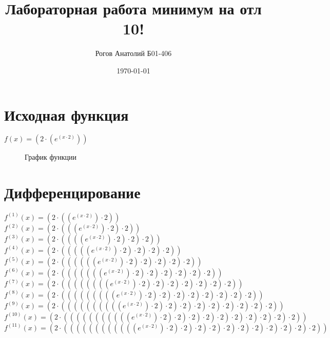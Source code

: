 \documentclass[12pt, letterpaper]{article}
\title{Лабораторная работа минимум на отл 10!}
\author{Рогов Анатолий Б01-406}
\date{\today}
\begin{document}
\maketitle
\newpage
\section{Исходная функция}
\centering
$f(x) = ({2}\cdot{(e^{({x}\cdot{2})})})$\\
\begin{figure}[h]
\centering
{}
\caption{График функции}
\end{figure}
\newpage
\section{Дифференцирование}
$f^{(1)}(x) = ({2}\cdot{({(e^{({x}\cdot{2})})}\cdot{2})})$\\
$f^{(2)}(x) = ({2}\cdot{({({(e^{({x}\cdot{2})})}\cdot{2})}\cdot{2})})$\\
$f^{(3)}(x) = ({2}\cdot{({({({(e^{({x}\cdot{2})})}\cdot{2})}\cdot{2})}\cdot{2})})$\\
$f^{(4)}(x) = ({2}\cdot{({({({({(e^{({x}\cdot{2})})}\cdot{2})}\cdot{2})}\cdot{2})}\cdot{2})})$\\
$f^{(5)}(x) = ({2}\cdot{({({({({({(e^{({x}\cdot{2})})}\cdot{2})}\cdot{2})}\cdot{2})}\cdot{2})}\cdot{2})})$\\
$f^{(6)}(x) = ({2}\cdot{({({({({({({(e^{({x}\cdot{2})})}\cdot{2})}\cdot{2})}\cdot{2})}\cdot{2})}\cdot{2})}\cdot{2})})$\\
$f^{(7)}(x) = ({2}\cdot{({({({({({({({(e^{({x}\cdot{2})})}\cdot{2})}\cdot{2})}\cdot{2})}\cdot{2})}\cdot{2})}\cdot{2})}\cdot{2})})$\\
$f^{(8)}(x) = ({2}\cdot{({({({({({({({({(e^{({x}\cdot{2})})}\cdot{2})}\cdot{2})}\cdot{2})}\cdot{2})}\cdot{2})}\cdot{2})}\cdot{2})}\cdot{2})})$\\
$f^{(9)}(x) = ({2}\cdot{({({({({({({({({({(e^{({x}\cdot{2})})}\cdot{2})}\cdot{2})}\cdot{2})}\cdot{2})}\cdot{2})}\cdot{2})}\cdot{2})}\cdot{2})}\cdot{2})})$\\
$f^{(10)}(x) = ({2}\cdot{({({({({({({({({({({(e^{({x}\cdot{2})})}\cdot{2})}\cdot{2})}\cdot{2})}\cdot{2})}\cdot{2})}\cdot{2})}\cdot{2})}\cdot{2})}\cdot{2})}\cdot{2})})$\\
$f^{(11)}(x) = ({2}\cdot{({({({({({({({({({({({(e^{({x}\cdot{2})})}\cdot{2})}\cdot{2})}\cdot{2})}\cdot{2})}\cdot{2})}\cdot{2})}\cdot{2})}\cdot{2})}\cdot{2})}\cdot{2})}\cdot{2})})$\\
\end{document}
